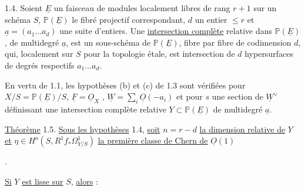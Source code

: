 
1.4. Soient $\underline{E}$ un faisceau de modules localement libres de rang $r+1$ sur un schéma $S$, $\mathbb{P}(\underline{E})$ le fibré projectif correspondant, $d$ un entier $\leq r$ et $\underline{a} = (a_1 \ldots a_d)$ une suite d'entiers. Une \underline{intersection complète} relative dans $\mathbb{P}(\underline{E})$, de multidegré $\underline{a}$, est un sous-schéma de $\mathbb{P}(\underline{E})$, fibre par fibre de codimension $d$, qui, localement sur $S$ pour la topologie étale, est intersection de $d$ hypersurfaces de degrés respectifs $a_1 \ldots a_d$.

En vertu de 1.1, les hypothèses (b) et (c) de 1.3 sont vérifiées pour $X/S = \mathbb{P}(\underline{E})/S$, $\underline{F} = \underline{O}_X$ , $\underline{W} = \sum\limits_i \underline{O}(-a_i)$ et pour $s$ une section de $\underline{W}^{\vee}$ définissant une intersection complète relative $Y \subset \mathbb{P}(\underline{E})$ de multidegré $\underline{a}$.

\underline{Théorème} 1.5. \underline{Sous les hypothèses} 1.4, \underline{soit} $n = r-d$ \underline{la dimension relative de} $Y$ \underline{et} $\eta \in H^o(S,R^1f_*\Omega^1_{Y/S})$ \underline{la première classe de Chern de} $\underline{O}(1)$

\begin{center}
\quad .
\end{center}
\underline{Si} $Y$ \underline{est lisse sur} $S$, \underline{alors} :

